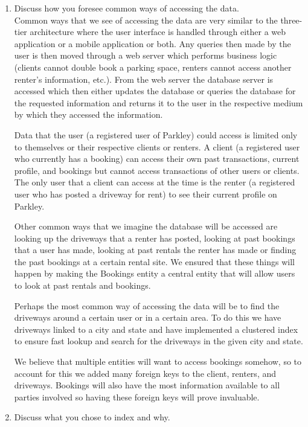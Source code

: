 \documentclass[a4paper]{article}
\begin{document}
\begin{enumerate}
\item Discuss how you foresee common ways of accessing the data. \\ 

Common ways that we see of accessing the data are very similar to the three-tier architecture where the user interface is handled through either a web application or a mobile application or both. Any queries then made by the user is then moved through a web server which performs business logic (clients cannot double book a parking space, renters cannot access another renter's information, etc.). From the web server the database server is accessed which then either updates the database or queries the database for the requested information and returns it to the user in the respective medium by which they accessed the information.

Data that the user (a registered user of Parkley) could access is limited only to themselves or their respective clients or renters. A client (a registered user who currently has a booking) can access their own past transactions, current profile, and bookings but cannot access transactions of other users or clients. The only user that a client can access at the time is the renter (a registered user who has posted a driveway for rent) to see their current profile on Parkley. 

Other common ways that we imagine the database will be accessed are looking up the driveways that a renter has posted, looking at past bookings that a user has made, looking at past rentals the renter has made or finding the past bookings at a certain rental site. We ensured that these things will happen by making the Bookings entity a central entity that will allow users to look at past rentals and bookings. 

Perhaps the most common way of accessing the data will be to find the driveways around a certain user or in a certain area. To do this we have driveways linked to a city and state and have implemented a clustered index to ensure fast lookup and search for the driveways in the given city and state. 

We believe that multiple entities will want to access bookings somehow, so to account for this we added many foreign keys to the client, renters, and driveways. Bookings will also have the most information available to all parties involved so having these foreign keys will prove invaluable. 
\item Discuss what you chose to index and why.
\\ 


\end{enumerate}
\end{document}

